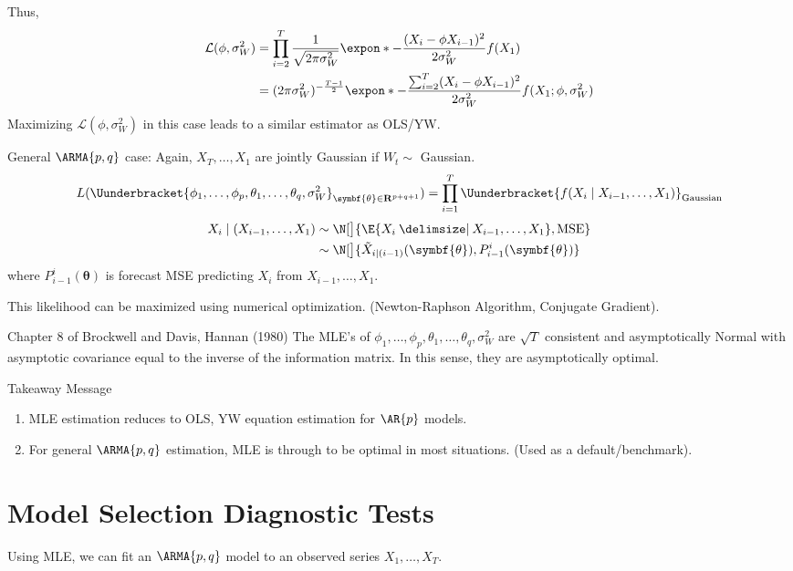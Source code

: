 Thus,
\begin{align*}
    \mathcal{L}(\phi,\sigma_W^2)
     & = \prod_{i=2}^T \frac{1}{\sqrt{2\pi\sigma_W^2}}\expon*{-\frac{(X_i-\phi X_{i-1})^2}{2\sigma_W^2} }f(X_1)                   \\
     & = (2\pi\sigma_W^2)^{-\frac{T-1}{2}}\expon*{-\frac{\sum_{i=2}^{T} (X_i-\phi X_{i-1})^2}{2\sigma_W^2}}f(X_1;\phi,\sigma_W^2)
\end{align*}
Maximizing $ \mathcal{L}(\phi,\sigma_W^2) $ in this case leads to a similar estimator as OLS/YW\@.

General $ \ARMA{p,q} $ case: Again, $ X_T,\ldots,X_1 $ are jointly
Gaussian if $ W_t \sim  $ Gaussian.
\[ L(\Uunderbracket{\phi_1,\ldots,\phi_p,\theta_1,\ldots,\theta_q,\sigma_W^2}_{\symbf{\theta}\in\mathbf{R}^{p+q+1}})=
    \prod_{i=1}^T \Uunderbracket{f(X_i\mid X_{i-1},\ldots,X_1)}_{\text{Gaussian}} \]
\begin{align*}
    X_i\mid (X_{i-1},\ldots,X_1)
     & \sim \N[\big]{\E{X_i\given X_{i-1},\ldots,X_1},\text{MSE}}                       \\
     & \sim \N[\big]{\tilde{X}_{i\mid (i-1)}(\symbf{\theta}),P_{i-1}^i(\symbf{\theta})}
\end{align*}
where $ P_{i-1}^i(\symbf{\theta}) $ is forecast MSE predicting $ X_i $ from $ X_{i-1},\ldots,X_1 $.

This likelihood can be maximized using numerical optimization. (Newton-Raphson Algorithm,
Conjugate Gradient).

\begin{Theorem}{Chapter 8 of Brockwell and Davis, Hannan (1980)}{}
    The MLE's of $ \phi_1,\ldots,\phi_p,\theta_1,\ldots,\theta_q,\sigma_W^2 $
    are $ \sqrt{T} $ consistent and asymptotically Normal with asymptotic covariance
    equal to the inverse of the information matrix. In this sense, they
    are asymptotically optimal.
\end{Theorem}
\begin{Remark}{Takeaway Message}{}
    \begin{enumerate}[(1)]
        \item MLE estimation reduces to OLS, YW equation estimation for $ \AR{p} $ models.
        \item For general $ \ARMA{p,q} $ estimation, MLE
              is through to be optimal in most situations. (Used as a default/benchmark).
    \end{enumerate}
\end{Remark}

\section{Model Selection Diagnostic Tests}
Using MLE, we can fit an $ \ARMA{p,q} $
model to an observed series $ X_1,\ldots ,X_T $.

